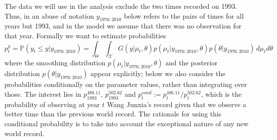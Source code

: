 \documentclass{statsoc}
\newcommand{\SMCSQ}{SMC$^2$\xspace}
\begin{document}
The data we will use in the analysis exclude the two times recorded on
1993. Thus, in an abuse of notation $y_{1976:2010}$ below refers to
the pairs of times for all years but 1993, and in the model we assume
that there was no observation for that year. Formally we want to
estimate probabilities 
\[
 p_t^{y} = \mathbb{P}(y_{t} \leq y | y_{1976:2010}) = 
\int_{\Theta} \int_\mathcal{X} G(y | \mu_{t}, \theta)
p(\mu_t | y_{1976:2010},\theta)
p(\theta | y_{1976:2010})\,
d\mu_{t} d\theta
\]
where the smoothing distribution $p(\mu_{t}\vert y_{1976:2010}, \theta)$ and
the posterior distribution $p(\theta \vert
y_{1976:2010})$ appear explicitly; below we also consider the
probabilities conditionally on the  parameter values, rather than integrating over
those. The interest lies in
$p_{1993}^{486.11}$, $p_{1993}^{502.62}$ and $p_t^{cond} :=
p_t^{486.11} / p_t^{502.62}$, 
which is the probability of observing at year $t$ Wang Junxia's record given
that we observe a better time than the previous world record. 
The rationale
for using this conditional probability is to take into account the exceptional
nature of any new world record. 



\end{document}
